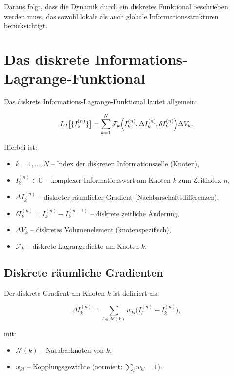 Daraus folgt, dass die Dynamik durch ein diskretes Funktional beschrieben werden muss, das sowohl lokale als auch globale Informationsstrukturen berücksichtigt.

\section{Das diskrete Informations-Lagrange-Funktional}
\label{sec:lagrange_funktional_def}

Das diskrete Informations-Lagrange-Funktional lautet allgemein:

\[
L_I \bigl[\{I_k^{(n)}\}\bigr] = \sum_{k=1}^{N} \mathcal{F}_k \Bigl( I_k^{(n)}, \Delta I_k^{(n)}, \delta I_k^{(n)} \Bigr) \Delta V_k.
\]

Hierbei ist:

\begin{itemize}
    \item \( k = 1, \dots, N \) – Index der diskreten Informationszelle (Knoten),
    \item \( I_k^{(n)} \in \mathbb{C} \) – komplexer Informationswert am Knoten \( k \) zum Zeitindex \( n \),
    \item \( \Delta I_k^{(n)} \) – diskreter räumlicher Gradient (Nachbarschaftsdifferenzen),
    \item \( \delta I_k^{(n)} = I_k^{(n)} - I_k^{(n-1)} \) – diskrete zeitliche Änderung,
    \item \( \Delta V_k \) – diskretes Volumenelement (knotenspezifisch),
    \item \( \mathcal{F}_k \) – diskrete Lagrangedichte am Knoten \( k \).
\end{itemize}

\subsection{Diskrete räumliche Gradienten}
\label{sub:diskrete_gradienten}

Der diskrete Gradient am Knoten \( k \) ist definiert als:

\[
\Delta I_k^{(n)} = \sum_{l \in \mathcal{N}(k)} w_{kl} \bigl( I_l^{(n)} - I_k^{(n)} \bigr),
\]

mit:

\begin{itemize}
    \item \( \mathcal{N}(k) \) – Nachbarknoten von \( k \),
    \item \( w_{kl} \) – Kopplungsgewichte (normiert: \( \sum_l w_{kl} = 1 \)).
\end{itemize}

